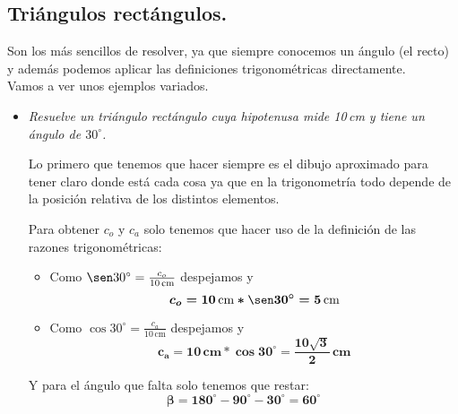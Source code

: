 \documentclass[a4paper,11pt,answers]{exam}
\newcommand{\degree}{^\circ}
\begin{document}
\subsection{Triángulos rectángulos.}
Son los más sencillos de resolver, ya que siempre conocemos un ángulo (el recto) y además podemos aplicar las definiciones trigonométricas directamente.\\
Vamos a ver unos ejemplos variados.
\begin{itemize}
\item \emph{Resuelve un triángulo rectángulo cuya hipotenusa mide 10\,cm y tiene un ángulo de $30\degree$.}
  \begin{solution}
    Lo primero que tenemos que hacer siempre es el dibujo aproximado para tener claro donde está cada cosa ya que en la trigonometría todo depende de la posición relativa de los distintos elementos.
    \begin{center}
    \end{center}
    Para obtener $c_o$ y $c_a$ solo tenemos que hacer uso de la definición de las razones trigonométricas:
    \begin{itemize}
    \item Como $\sen 30\degree = \frac{c_o}{10\,\text{cm}}$ despejamos y
      \[\boldsymbol{c_o = 10\,\text{cm} * \sen 30\degree = 5\,\text{cm}}\]
    \item Como $\cos 30\degree = \frac{c_a}{10\,\text{cm}}$ despejamos y
      \[\boldsymbol{c_a = 10\,\text{cm} * \cos 30\degree = \frac{10\sqrt{3}}{2}\,\text{cm}}\]
    \end{itemize}
    Y para el ángulo que falta solo tenemos que restar:
    \[\boldsymbol{\beta = 180\degree - 90\degree -30\degree = 60\degree}\]
  \end{solution}


\end{itemize}
\end{document}
